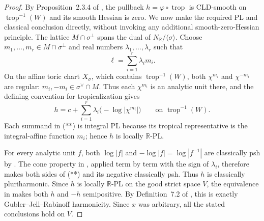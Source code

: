\begin{proof}
By Proposition~2.3.4 of \cite{BGJKK25}, the pullback
$h=\varphi\circ\operatorname{trop}$ is CLD-smooth on
$\operatorname{trop}^{-1}(W)$ and its smooth Hessian is zero.  We now make
the required PL and classical conclusion directly, without invoking any
additional smooth-zero-Hessian principle.  The lattice
$M\cap\sigma^\perp$ spans the dual of $N_{\mathbb R}/\langle\sigma\rangle$.
Choose $m_1,\ldots,m_r\in M\cap\sigma^\perp$ and real numbers
$\lambda_1,\ldots,\lambda_r$ such that
\[
                         \ell=\sum_{i=1}^r\lambda_i m_i.
\]
On the affine toric chart $X_\sigma$, which contains
$\operatorname{trop}^{-1}(W)$, both $\chi^{m_i}$ and $\chi^{-m_i}$ are
regular: $m_i,-m_i\in\sigma^\vee\cap M$.  Thus each $\chi^{m_i}$ is an
analytic unit there, and the defining convention for tropicalization gives
\[
 h=c+\sum_{i=1}^r\lambda_i\bigl(-\log|\chi^{m_i}|\bigr)
 \qquad\text{on }\operatorname{trop}^{-1}(W).
\tag{**}\label{eq:p062-invariant-toric-character-formula}
\]
Each summand in (**) is integral PL because its tropical representative is
the integral-affine function $m_i$; hence $h$ is locally $\mathbb R$-PL.

For every analytic unit $f$, both $\log|f|$ and $-\log|f|=\log|f^{-1}|$
are classically psh by \cite[Proposition~4.2(2)]{GR25Classical}.  The cone
property in \cite[Proposition~4.2(3)]{GR25Classical}, applied term by term
with the sign of $\lambda_i$, therefore makes both sides of (**) and its
negative classically psh.  Thus $h$ is classically pluriharmonic.  Since
$h$ is locally $\mathbb R$-PL on the good strict space $V$, the equivalence
in \cite[Theorem~4.3]{GR25Classical} makes both $h$ and $-h$ semipositive.
By Definition~7.2 of \cite{GJR26}, this is exactly Gubler--Jell--Rabinoff
harmonicity.  Since $x$ was arbitrary, all the stated conclusions hold on
$V$.
\end{proof}
